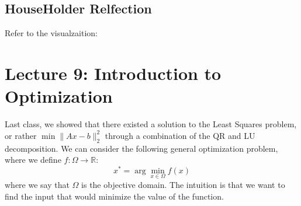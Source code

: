 \documentclass[11pt]{article}
\theoremstyle{definition}
\newcommand{\R}{\mathbb{R}}
\begin{document}
\subsection{HouseHolder Relfection}
Refer to the visualzaition:
\begin{figure}[H]
  \centering
\end{figure}


\section{Lecture 9: Introduction to Optimization}
Last class, we showed that there existed a solution to the Least Squares problem, or rather $\min \|Ax - b\|^2_2$ through a combination of the QR and LU decomposition. We can consider the following general optimization problem, where we define $f: \Omega \to \R$:
\[
x^* = \arg \min_{x \in \Omega} f(x)
\]
where we say that $\Omega$ is the objective domain. The intuition is that we want to find the input that would minimize the value of the function. 
\end{document}
